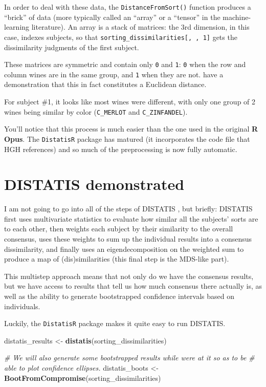 \documentclass[
]{book}
\newenvironment{Shaded}{\begin{snugshade}}{\end{snugshade}}
\newcommand{\CommentTok}[1]{\textcolor[rgb]{0.56,0.35,0.01}{\textit{#1}}}
\newcommand{\FunctionTok}[1]{\textcolor[rgb]{0.13,0.29,0.53}{\textbf{#1}}}
\newcommand{\NormalTok}[1]{#1}
\newcommand{\OtherTok}[1]{\textcolor[rgb]{0.56,0.35,0.01}{#1}}
\begin{document}
In order to deal with these data, the \texttt{DistanceFromSort()} function produces a ``brick'' of data (more typically called an ``array'' or a ``tensor'' in the machine-learning literature). An array is a stack of matrices: the 3rd dimension, in this case, indexes subjects, so that \texttt{sorting\_dissimilarities{[},\ ,\ 1{]}} gets the dissimilarity judgments of the first subject.

These matrices are symmetric and contain only \texttt{0} and \texttt{1}: \texttt{0} when the row and column wines are in the same group, and \texttt{1} when they are not. \citet{abdiAnalyzing2007} have a demonstration that this in fact constitutes a Euclidean distance.

For subject \#1, it looks like most wines were different, with only one group of 2 wines being similar by color (\texttt{C\_MERLOT} and \texttt{C\_ZINFANDEL}).

You'll notice that this process is much easier than the one used in the original \textbf{R Opus}. The \texttt{DistatisR} package has matured (it incorporates the code file that HGH references) and so much of the preprocessing is now fully automatic.

\section{DISTATIS demonstrated}\label{distatis-demonstrated}

I am not going to go into all of the steps of DISTATIS \citep[see instead][]{abdiAnalyzing2007}, but briefly: DISTATIS first uses multivariate statistics to evaluate how similar all the subjects' sorts are to each other, then weights each subject by their similarity to the overall consensus, uses these weights to sum up the individual results into a consensus dissimilarity, and finally uses an eigendecomposition on the weighted sum to produce a map of (dis)similarities (this final step is the MDS-like part).

This multistep approach means that not only do we have the consensus results, but we have access to results that tell us how much consensus there actually is, as well as the ability to generate bootstrapped confidence intervals based on individuals.

Luckily, the \texttt{DistatisR} package makes it quite easy to run DISTATIS.

\begin{Shaded}
\begin{Highlighting}[]
\NormalTok{distatis\_results }\OtherTok{\textless{}{-}} \FunctionTok{distatis}\NormalTok{(sorting\_dissimilarities)}

\CommentTok{\# We will also generate some bootstrapped results while we\textquotesingle{}re at it so as to be}
\CommentTok{\# able to plot confidence ellipses.}
\NormalTok{distatis\_boots }\OtherTok{\textless{}{-}} \FunctionTok{BootFromCompromise}\NormalTok{(sorting\_dissimilarities)}
\end{Highlighting}
\end{Shaded}
\end{document}
